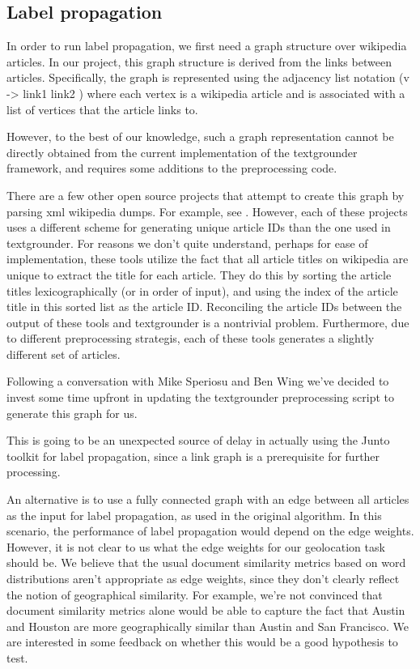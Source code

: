 \subsection{Label propagation}
In order to run label propagation, we first need a graph structure over wikipedia articles. In our project, this graph structure is derived from the links between articles. Specifically, the graph is represented using the adjacency list notation (v -> link1 link2 ) where each vertex is a wikipedia article and is associated with a list of vertices that the article links to.

However, to the best of our knowledge, such a graph representation cannot be directly obtained from the current implementation of the textgrounder framework, and requires some additions to the preprocessing code.

There are a few other open source projects that attempt to create this graph by parsing xml wikipedia dumps. For example, see \cite{} \cite{} \cite{}. However, each of these projects uses a different scheme for generating unique article IDs than the one used in textgrounder. For reasons we don't quite understand, perhaps for ease of implementation, these tools utilize the fact that all article titles on wikipedia are unique to extract the title for each article. They do this by sorting the article titles lexicographically (or in order of input), and using the index of the article title in this sorted list as the article ID. Reconciling the article IDs between the output of these tools and textgrounder is a nontrivial problem. Furthermore, due to different preprocessing strategis, each of these tools generates a slightly different set of articles.

Following a conversation with Mike Speriosu and Ben Wing we've decided to invest some time upfront in updating the textgrounder preprocessing script to generate this graph for us.

This is going to be an unexpected source of delay in actually using the Junto toolkit for label propagation, since a link graph is a prerequisite for further processing.

An alternative is to use a fully connected graph with an edge between all articles as the input for label propagation, as used in the original algorithm. In this scenario, the performance of label propagation would depend on the edge weights. However, it is not clear to us what the edge weights for our geolocation task should be. We believe that the usual document similarity metrics based on word distributions aren't appropriate as edge weights, since they don't clearly reflect the notion of geographical similarity. For example, we're not convinced that document similarity metrics alone would be able to capture the fact that Austin and Houston are more geographically similar than Austin and San Francisco. We are interested in some feedback on whether this would be a good hypothesis to test.
